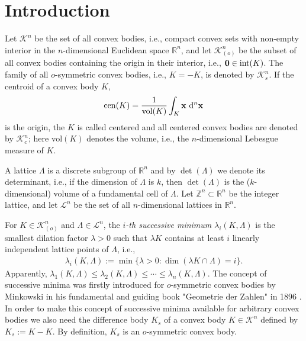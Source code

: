\documentclass{amsart}
\theoremstyle{definition}
\theoremstyle{remark}
\numberwithin{equation}{section}
\begin{document}
\section{\bf Introduction}\label{section:introduction}
Let $\mathcal{K}^n$ be the set of all convex bodies, i.e., compact convex sets with non-empty interior in the $n$-dimensional Euclidean space $\mathbb{R}^n$,  and let ${\mathcal K}^n_{(o)}$ be the subset of all convex bodies containing the origin in their interior, i.e., ${\bf 0}\in\mathrm{int}(K)$. The family of all $o$-symmetric convex bodies, i.e., $K=-K$, is denoted by $\mathcal{K}_s^n$. If the centroid of a convex body $K$, 
$$
\mathrm{cen}(K)=\frac{1}{\mathrm{vol}(K)}\int_K{\bf x}~\mathrm{d}^n{\bf x}
$$
is the origin, the $K$ is called centered and all centered convex bodies are denoted by $\mathcal{K}_c^n$; here  $\mathrm{vol}(K)$ denotes the volume, i.e., the $n$-dimensional Lebesgue measure of $K$. 

A lattice $\Lambda$ is a discrete subgroup of $\mathbb{R}^n$ 
and by $\det(\Lambda)$ we denote its determinant, i.e., if the dimension of $\Lambda$ is $k$, then $\det(\Lambda)$ is the ($k$-dimensional) volume of a fundamental cell of $\Lambda$.  
 Let $\mathbb{Z}^n\subset \mathbb{R}^n$ be the integer lattice,  and let $\mathcal{L}^n$ be the set of all $n$-dimensional lattices in $\mathbb{R}^n$. 
 
% 

For $K\in{\mathcal K}^n_{(o)}$ and $\Lambda\in\mathcal{L}^n$, the {\it $i$-th successive minimum} $\lambda_i(K,\Lambda)$ is the smallest dilation factor $\lambda>0$ such that $\lambda K$ contains at least $i$ linearly independent lattice points of $\Lambda$, i.e.,
\begin{align*}
    \lambda_i(K,\Lambda):=\min\{\lambda>0:\dim(\lambda K\cap\Lambda)=i\}.
\end{align*}
Apparently, $\lambda_1(K,\Lambda)\le\lambda_2(K,\Lambda)\le\cdots\le\lambda_n(K,\Lambda)$. The concept of successive minima was firstly introduced for $o$-symmetric convex bodies by Minkowski in his fundamental and guiding book "Geometrie der Zahlen" in 1896 \cite{minkowski1896}.
In order to make this concept of successive minima  available for arbitrary convex bodies we also need the difference body $K_s$ of a convex body $K\in\mathcal{K}^n$ defined by $K_s:=K-K$. By definition, $K_s$ is an $o$-symmetric convex body.  
\end{document}
